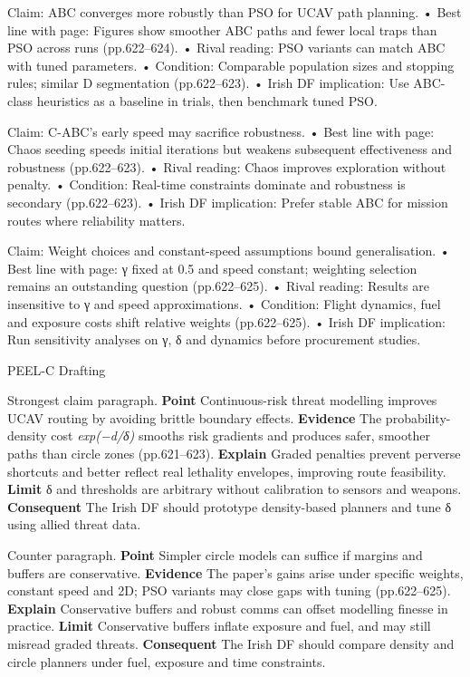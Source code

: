 Claim: ABC converges more robustly than PSO for UCAV path planning.
• Best line with page: Figures show smoother ABC paths and fewer local traps than PSO across runs (pp.622–624).
• Rival reading: PSO variants can match ABC with tuned parameters.
• Condition: Comparable population sizes and stopping rules; similar D segmentation (pp.622–623).
• Irish DF implication: Use ABC-class heuristics as a baseline in trials, then benchmark tuned PSO.

Claim: C-ABC’s early speed may sacrifice robustness.
• Best line with page: Chaos seeding speeds initial iterations but weakens subsequent effectiveness and robustness (pp.622–623).
• Rival reading: Chaos improves exploration without penalty.
• Condition: Real-time constraints dominate and robustness is secondary (pp.622–623).
• Irish DF implication: Prefer stable ABC for mission routes where reliability matters.

Claim: Weight choices and constant-speed assumptions bound generalisation.
• Best line with page: γ fixed at 0.5 and speed constant; weighting selection remains an outstanding question (pp.622–625).
• Rival reading: Results are insensitive to γ and speed approximations.
• Condition: Flight dynamics, fuel and exposure costs shift relative weights (pp.622–625).
• Irish DF implication: Run sensitivity analyses on γ, δ and dynamics before procurement studies.

PEEL-C Drafting

Strongest claim paragraph.
\textbf{Point} Continuous-risk threat modelling improves UCAV routing by avoiding brittle boundary effects.
\textbf{Evidence} The probability-density cost \emph{exp(−d/δ)} smooths risk gradients and produces safer, smoother paths than circle zones (pp.621–623).
\textbf{Explain} Graded penalties prevent perverse shortcuts and better reflect real lethality envelopes, improving route feasibility.
\textbf{Limit} δ and thresholds are arbitrary without calibration to sensors and weapons. \textbf{Consequent} The Irish DF should prototype density-based planners and tune δ using allied threat data.

Counter paragraph.
\textbf{Point} Simpler circle models can suffice if margins and buffers are conservative.
\textbf{Evidence} The paper’s gains arise under specific weights, constant speed and 2D; PSO variants may close gaps with tuning (pp.622–625).
\textbf{Explain} Conservative buffers and robust comms can offset modelling finesse in practice.
\textbf{Limit} Conservative buffers inflate exposure and fuel, and may still misread graded threats. \textbf{Consequent} The Irish DF should compare density and circle planners under fuel, exposure and time constraints.

